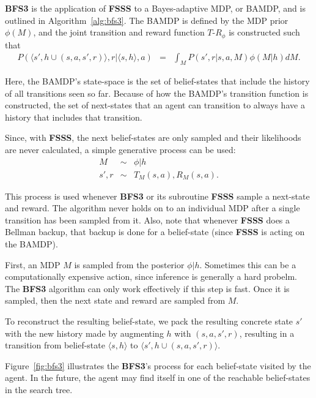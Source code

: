 {\bf BFS3} is the application of {\bf FSSS} to a Bayes-adaptive MDP, or BAMDP, and is outlined in Algorithm~\ref{alg:bfs3}. The BAMDP is defined by the MDP prior~$\phi(M)$, and the joint transition and reward function ${T\mbox{-}R}_\phi$ is constructed such that
\begin{eqnarray*}
P(\langle s', h\cup (s,a,s',r)\rangle, r | \langle s, h\rangle, a) &=& \int_M P(s', r | s, a, M)\phi(M|h) dM.
\end{eqnarray*}

Here, the BAMDP's state-space is the set of belief-states that include the history of all transitions seen so far. Because of how the BAMDP's transition function is constructed, the set of next-states that an agent can transition to always have a history that includes that transition.

Since, with {\bf FSSS}, the next belief-states are only sampled and their likelihoods are never calculated, a simple generative process can be used:
\begin{eqnarray}
M &\sim& \phi|h \label{eq:oracle1}\\
s', r &\sim& T_M(s,a), R_M(s,a).\label{eq:oracle2}
\end{eqnarray}

This process is used whenever {\bf BFS3} or its subroutine {\bf FSSS} sample a next-state and reward. The algorithm never holds on to an individual MDP after a single transition has been sampled from it. Also, note that whenever {\bf FSSS} does a Bellman backup, that backup is done for a belief-state (since {\bf FSSS} is acting on the BAMDP).

First, an MDP $M$ is sampled from the posterior $\phi|h$. Sometimes this can be a computationally expensive action, since inference is generally a hard probelm. The {\bf BFS3} algorithm can only work effectively if this step is fast. Once it is sampled, then the next state and reward are sampled from $M$.

To reconstruct the resulting belief-state, we pack the resulting concrete state $s'$ with the new history made by augmenting $h$ with $(s, a, s', r)$, resulting in a transition from belief-state $\langle s, h\rangle$ to $\langle s', h\cup (s,a,s',r)\rangle$.

Figure~\ref{fig:bfs3} illustrates the {\bf BFS3}'s process for each belief-state visited by the agent. In the future, the agent may find itself in one of the reachable belief-states in the search tree.

